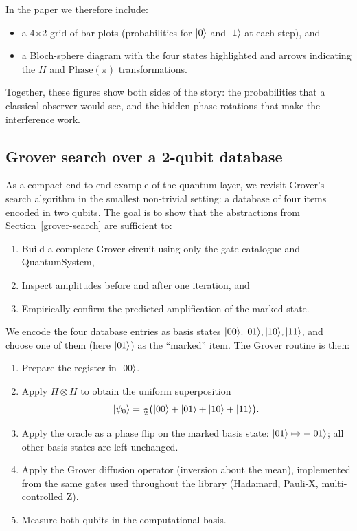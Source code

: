 \documentclass[a4paper,11pt]{article}
\begin{document}
In the paper we therefore include:

\begin{itemize}
  \item a 4×2 grid of bar plots (probabilities for $\lvert 0 \rangle$ and $\lvert 1 \rangle$ at each step), and
  \item a Bloch-sphere diagram with the four states highlighted and arrows indicating the $H$ and $\mathrm{Phase}(\pi)$ transformations.
\end{itemize}

Together, these figures show both sides of the story: the probabilities that a classical observer would see, and the hidden phase rotations that make the interference work.

\subsection{Grover search over a 2-qubit database}
\label{sec:grover-small-n}

As a compact end-to-end example of the quantum layer, we revisit Grover's search algorithm in the smallest non-trivial setting: a database of four items encoded in two qubits. The goal is to show that the abstractions from Section~\ref{grover-search} are sufficient to:

\begin{enumerate}
\item Build a complete Grover circuit using only the gate catalogue and QuantumSystem,
\item Inspect amplitudes before and after one iteration, and
\item Empirically confirm the predicted amplification of the marked state.
\end{enumerate}

We encode the four database entries as basis states
\(\lvert 00 \rangle, \lvert 01 \rangle, \lvert 10 \rangle, \lvert 11 \rangle\), and choose one of them (here \(\lvert 01 \rangle\)) as the ``marked'' item. The Grover routine is then:

\begin{enumerate}
\item Prepare the register in \(\lvert 00 \rangle\).
\item Apply \(H \otimes H\) to obtain the uniform superposition
\[
  \lvert \psi_0 \rangle
  = \tfrac{1}{2}\bigl(\lvert 00 \rangle + \lvert 01 \rangle + \lvert 10 \rangle + \lvert 11 \rangle\bigr).
\]
\item Apply the oracle as a phase flip on the marked basis state:
\(\lvert 01 \rangle \mapsto -\lvert 01 \rangle\); all other basis states are left unchanged.
\item Apply the Grover diffusion operator (inversion about the mean), implemented from the same gates used throughout the library (Hadamard, Pauli-X, multi-controlled Z).
\item Measure both qubits in the computational basis.
\end{enumerate}
\end{document}
